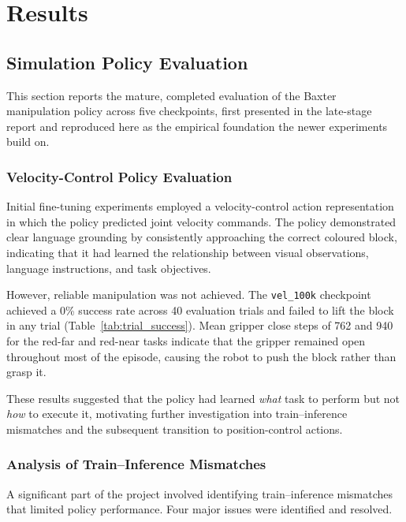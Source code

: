 \documentclass[12pt]{article}
\begin{document}
\section{Results}
\label{sec:results}

\subsection{Simulation Policy Evaluation}
\label{sec:results-sim}

This section reports the mature, completed evaluation of the Baxter manipulation policy across five checkpoints, first presented in the late-stage report and reproduced here as the empirical foundation the newer experiments build on.

\subsubsection{Velocity-Control Policy Evaluation}

Initial fine-tuning experiments employed a velocity-control action representation in which the policy predicted joint velocity commands. The policy demonstrated clear language grounding by consistently approaching the correct coloured block, indicating that it had learned the relationship between visual observations, language instructions, and task objectives.

However, reliable manipulation was not achieved. The \texttt{vel\_100k} checkpoint achieved a 0\% success rate across 40 evaluation trials and failed to lift the block in any trial (Table~\ref{tab:trial_success}). Mean gripper close steps of 762 and 940 for the red-far and red-near tasks indicate that the gripper remained open throughout most of the episode, causing the robot to push the block rather than grasp it.

These results suggested that the policy had learned \emph{what} task to perform but not \emph{how} to execute it, motivating further investigation into train--inference mismatches and the subsequent transition to position-control actions.

\subsubsection{Analysis of Train--Inference Mismatches}

A significant part of the project involved identifying train--inference mismatches that limited policy performance. Four major issues were identified and resolved.
\end{document}
